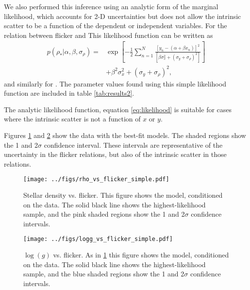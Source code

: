 We also performed this inference using an analytic form of the marginal
likelihood, which accounts for 2-D uncertainties but does not allow the
intrinsic scatter to be a function of the dependent or independent variables.
For the relation between flicker and \rhostar This likelihood function can be
written as
\begin{eqnarray}
	p(\rho_*|\alpha, \beta, \sigma_{\rho}) = &
	\exp \left[-\frac{1}{2} \sum_{n=1}^N\frac{[y_n-(\alpha + \beta x_n)]^2}
	{\left[\beta \sigma_x^2 + (\sigma_y + \sigma_{\rho})^2\right]}\right]
	\\ \nonumber
	& + \beta^2 \sigma_x^2 + (\sigma_y + \sigma_{\rho})^2,
\end{eqnarray}
\label{eq:likelihood}
and similarly for \logg.
The parameter values found using this simple likelihood function are included
in table \ref{tab:results2}.

The analytic likelihood function, equation \ref{eq:likelihood} is suitable for
cases where the intrinsic scatter is not a function of $x$ or $y$.

Figures \ref{fig:rhostar} and \ref{fig:logg} show the data with the best-fit
models.
The shaded regions show the 1 and 2$\sigma$ confidence interval.
These intervals are representative of the uncertainty in the flicker relations,
but also of the intrinsic scatter in those relations.

\begin{figure}
\begin{center}
\texttt{[image: ../figs/rho\_vs\_flicker\_simple.pdf]}
\caption{
Stellar density vs. flicker.
This figure shows the model, conditioned on the data.
The solid black line shows the highest-likelihood sample, and the pink shaded
regions show the 1 and 2$\sigma$ confidence intervals.}
\label{fig:rhostar}
\end{center}
\end{figure}

\begin{figure}
\begin{center}
\texttt{[image: ../figs/logg\_vs\_flicker\_simple.pdf]}
\caption{
$\log(g)$ vs. flicker.
As in \ref{fig:rhostar} this figure shows the model, conditioned on the data.
The solid black line shows the highest-likelihood sample, and the blue shaded
regions show the 1 and 2$\sigma$ confidence intervals.}
\label{fig:logg}
\end{center}
\end{figure}

